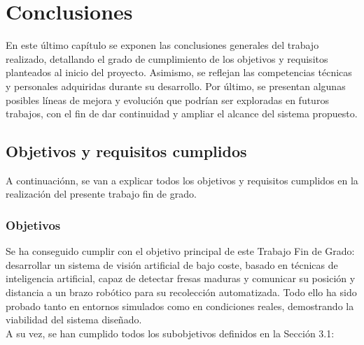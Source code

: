 \chapter{Conclusiones}
\label{cap:capitulo6}

En este último capítulo se exponen las conclusiones generales del trabajo realizado, detallando el grado de cumplimiento de los objetivos y requisitos planteados al inicio del proyecto. Asimismo, se reflejan las competencias técnicas y personales adquiridas durante su desarrollo. Por último, se presentan algunas posibles líneas de mejora y evolución que podrían ser exploradas en futuros trabajos, con el fin de dar continuidad y ampliar el alcance del sistema propuesto.

\section{Objetivos y requisitos cumplidos}
\label{sec:objetivos_y_requisitos}

A continuaciónn, se van a explicar todos los objetivos y requisitos cumplidos en la realización del presente trabajo fin de grado.

\subsection{Objetivos}
\label{subsec:objetivos}

Se ha conseguido cumplir con el objetivo principal de este Trabajo Fin de Grado: desarrollar un sistema de visión artificial de bajo coste, basado en técnicas de inteligencia artificial, capaz de detectar fresas maduras y comunicar su posición y distancia a un brazo robótico para su recolección automatizada. Todo ello ha sido probado tanto en entornos simulados como en condiciones reales, demostrando la viabilidad del sistema diseñado.\\

A su vez, se han cumplido todos los subobjetivos definidos en la Sección 3.1:

